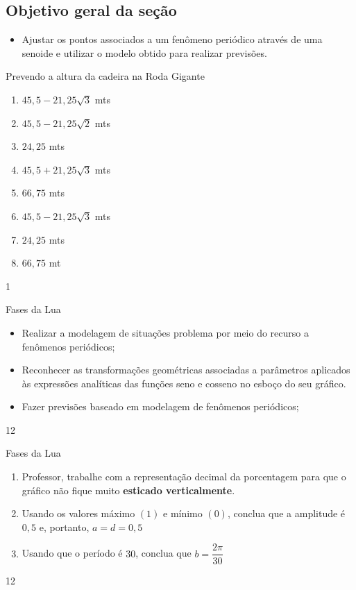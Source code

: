 \cleardoublepage
\def\currentcolor{session1}
\begin{texto}
{
	\subsection{Objetivo geral da seção}
	\begin{itemize}
	\item Ajustar os pontos associados a um fenômeno periódico através de uma senoide e utilizar o modelo obtido para realizar previsões.
	\end{itemize}
}
\end{texto}
\begin{answer}{Prevendo a altura da cadeira na Roda Gigante}
{
\begin{enumerate}
\item $45{,}5-21,25\sqrt{3}$ mts
\item $45{,}5-21,25\sqrt{2}$ mts
\item $24{,}25$ mts
\item $45{,}5+21,25\sqrt{3}$ mts
\item $66{,}75$ mts
\item $45{,}5-21,25\sqrt{3}$ mts
\item $24{,}25$ mts
\item $66{,}75$ mt
\end{enumerate}
}{1}
\end{answer}
\clearmargin
\begin{objectives}{Fases da Lua}
{
\begin{itemize}
\item Realizar a modelagem de situações problema por meio do
recurso a fenômenos periódicos;
\item Reconhecer as transformações geométricas associadas a
parâmetros aplicados às expressões analíticas das funções
seno e cosseno no esboço do seu gráfico.
\item Fazer previsões baseado em modelagem de fenômenos
periódicos;
\end{itemize}
}{1}{2}
\end{objectives}
\begin{sugestions}{Fases da Lua}
{
\begin{enumerate}
\item Professor, trabalhe com a representação decimal da
porcentagem para que o gráfico não fique muito \textbf{esticado
verticalmente}.
\item Usando os valores máximo $(1)$ e mínimo $(0)$, conclua que a
amplitude é $0{,}5$ e, portanto, $a=d=0{,}5$
\item Usando que o período é $30$, conclua que $b=\dfrac{2\pi}{30}$
\end{enumerate}
}{1}{2}
\end{sugestions}
